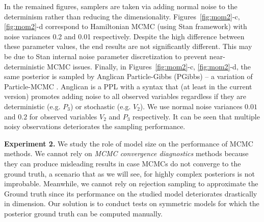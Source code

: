 \documentclass{article}
\begin{document}
In the remained figures, samplers are taken via adding normal noise to the determinism rather than reducing the dimensionality.
Figures~\ref{fig:mom2}-c, \ref{fig:mom2}-d
correspond to Hamiltonian MCMC (using Stan framework) 
with noise variances 0.2 and 0.01 respectively. 
Despite the high difference between these parameter values, the end results are not significantly different. 
This may be due to Stan
internal noise parameter discretization to prevent near-deterministic MCMC issues. 
Finally, in Figures~\ref{fig:mom2}-c, \ref{fig:mom2}-d, the same posterior is sampled by Anglican
Particle-Gibbs (PGibbs) -- a variation of Particle-MCMC \cite{andrieu2010particle}. 
Anglican \cite{wood2014new} is a PPL with a syntax that (at least in the current version) promotes adding noise to all observed variables regardless if they are deterministic 
(e.g. $P_3$) or stochastic (e.g. $V_2$). 
We use normal noise variances $0.01$ and $0.2$ for observed variables $V_2$  and $P_3$ respectively.
It can be seen that multiple noisy observations deteriorates the sampling performance.

\textbf{Experiment 2.} %
We study the role of model size on the performance of MCMC methods.
We cannot rely on \emph{MCMC convergence diagnostics} methods \cite{cowles1996markov} because they can produce misleading results in case MCMCs do not converge to the ground truth, a scenario that as we will see, for highly complex posteriors is not improbable.
Meanwhile, we cannot rely on rejection sampling to approximate the Ground truth since its performance on the studied model deteriorates drastically in dimension.
Our solution is to conduct tests on symmetric models for which the posterior ground truth can be computed manually.
\end{document}
